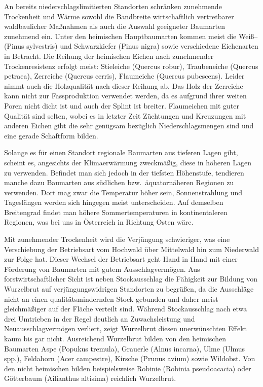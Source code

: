 \documentclass[twocolumn]{scrartcl}
\begin{document}
An bereits niederschlagslimitierten Standorten schränken zunehmende Trockenheit
und Wärme sowohl die Bandbreite wirtschaftlich vertretbarer waldbaulicher
Maßnahmen als auch die Auswahl geeigneter Baumarten zunehmend ein. Unter den
heimischen Hauptbaumarten kommen meist die Weiß-- (Pinus sylvestris) und
Schwarzkiefer (Pinus nigra) sowie verschiedene Eichenarten in Betracht. Die
Reihung der heimischen Eichen nach zunehmender Trockenresistenz erfolgt meist:
Stieleiche (Quercus robur), Traubeneiche (Quercus petraea), Zerreiche (Quercus
cerris), Flaumeiche (Quercus pubescens). Leider nimmt auch die Holzqualität nach
dieser Reihung ab. Das Holz der Zerreiche kann nicht zur Fassproduktion
verwendet werden, da es aufgrund ihrer weiten Poren nicht dicht ist und auch der
Splint ist breiter. Flaumeichen mit guter Qualität sind selten, wobei es in
letzter Zeit Züchtungen und Kreuzungen mit anderen Eichen gibt die sehr genügsam
bezüglich Niederschlagsmengen sind und eine gerade Schaftform bilden.

Solange es für einen Standort regionale Baumarten aus tieferen Lagen gibt,
scheint es, angesichts der Klimaerwärmung zweckmäßig, diese in höheren Lagen zu
verwenden. Befindet man sich jedoch in der tiefsten Höhenstufe, tendieren manche
dazu Baumarten aus südlichen bzw.\ äquatornäheren Regionen zu verwenden. Dort
mag zwar die Temperatur höher sein, Sonnenstrahlung und Tageslängen werden sich
hingegen meist unterscheiden. Auf demselben Breitengrad findet man höhere
Sommertemperaturen in kontinentaleren Regionen, was bei uns in Österreich in
Richtung Osten wäre.

Mit zunehmender Trockenheit wird die Verjüngung schwieriger, was eine
Verschiebung der Betriebsart vom Hochwald über Mittelwald hin zum Niederwald zur
Folge hat. Dieser Wechsel der Betriebsart geht Hand in Hand mit einer Förderung
von Baumarten mit gutem Ausschlagvermögen. Aus forstwirtschaftlicher Sicht ist
neben Stockausschlag die Fähigkeit zur Bildung von Wurzelbrut auf
verjüngungswidrigen Standorten zu begrüßen, da die Ausschläge nicht an einen
qualitätsmindernden Stock gebunden und daher meist gleichmäßiger auf der Fläche
verteilt sind. Während Stockausschlag nach etwa drei Umtrieben in der Regel
deutlich an Zuwachsleistung und Neuausschlagvermögen verliert, zeigt Wurzelbrut
diesen unerwünschten Effekt kaum bis gar nicht. Ausreichend Wurzelbrut bilden
von den heimischen Baumarten Aspe (Popukus tremula), Grauerle (Alnus incarna),
Ulme (Ulmus spp.), Feldahorn (Acer campestre), Kirsche (Prunus avium) sowie
Wildobst. Von den nicht heimischen bilden beispielsweise Robinie (Robinia
pseudoacacia) oder Götterbaum (Ailianthus altisima) reichlich Wurzelbrut.
\end{document}

